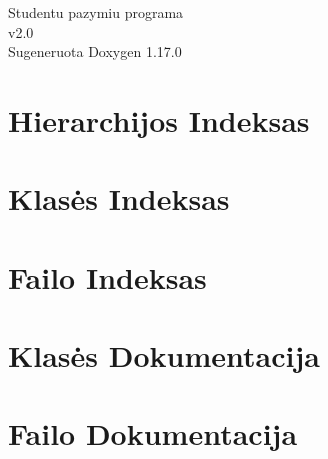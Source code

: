 \documentclass[twoside]{book}
\newcommand{\+}{\discretionary{\mbox{\scriptsize$\hookleftarrow$}}{}{}}
\newcommand{\clearemptydoublepage}{%
    \newpage{\pagestyle{empty}\cleardoublepage}%
  }
\begin{document}
  \raggedbottom
    \hypersetup{pageanchor=false,
                bookmarksnumbered=true,
                pdfencoding=unicode
               }
  \begin{titlepage}
  \vspace*{7cm}
  \begin{center}%
  {\Large Studentu pazymiu programa}\\
  [1ex]\large v2.\+0 \\
  \vspace*{1cm}
  {\large Sugeneruota Doxygen 1.17.0}\\
  \end{center}
  \end{titlepage}
  \clearemptydoublepage
  \tableofcontents
  \clearemptydoublepage
  \hypersetup{pageanchor=true}

\chapter{Hierarchijos Indeksas}

\chapter{Klasės Indeksas}

\chapter{Failo Indeksas}

\chapter{Klasės Dokumentacija}


\chapter{Failo Dokumentacija}






  \backmatter
  \newpage
  \clearemptydoublepage
  \printindex
\end{document}
